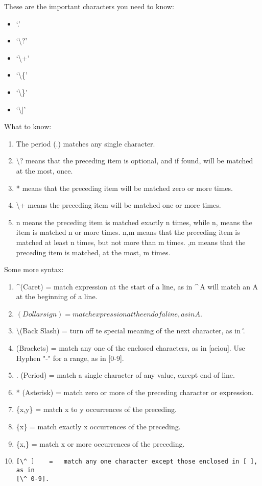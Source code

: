 \documentclass[12pt,a4paper]{article}
\begin{document}
These are the important characters you need to know:
\begin{itemize}
\item `.'
\item `\textbackslash?'
\item `\textbackslash+'
\item `\textbackslash\{'
\item `\textbackslash\}'
\item `\textbackslash|'
\end{itemize}

What to know:
\begin{enumerate}
\item The period (.) matches any single character.
\item \textbackslash? means that the preceding item is optional, and if found, will be matched at the most, once.
\item * means that the preceding item will be matched zero or more times.
\item \textbackslash+ means the preceding item will be matched one or more times.
\item {n} means the preceding item is matched exactly n times, while {n,} means the item is matched n or more times. {n,m} means that the preceding item is matched at least n times, but not more than m times. {,m} means that the preceding item is matched, at the most, m times.
\end{enumerate}

Some more syntax:
\begin{enumerate}
\item \textasciicircum (Caret)   =   match expression at the start of a line, as
in \textasciicircum\,A will match an A at the beginning of a line.
\item $ (Dollar sign)    =   match expression at the end of a line, as in A$.
\item \textbackslash (Back Slash)  =   turn off te special meaning of the next character, as in \^.
\item [ ] (Brackets)  =   match any one of the enclosed characters, as in [aeiou]. Use Hyphen "-" for a range, as in [0-9].
\item . (Period)  =   match a single character of any value, except end of line.
\item * (Asterisk)    =   match zero or more of the preceding character or expression.
\item \{x,y\} =   match x to y occurrences of the preceding.
\item \{x\}   =   match exactly x occurrences of the preceding.
\item  \{x,\}  =   match x or more occurrences of the preceding.
\item \begin{verbatim}[\^ ]    =   match any one character except those enclosed in [ ], as in
[\^ 0-9].\end{verbatim}
\end{enumerate}
\end{document}
